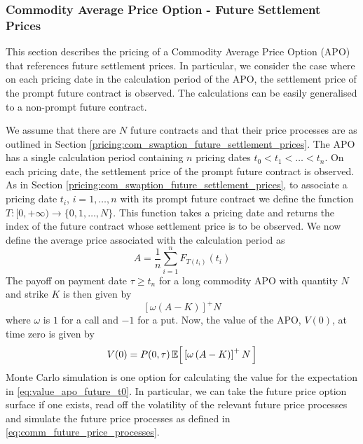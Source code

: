 \subsubsection{Commodity Average Price Option - Future Settlement Prices}
\label{pricing:com_apo_future_settlement_prices}

This section describes the pricing of a Commodity Average Price Option (APO) that references future settlement prices. In particular, we consider the case where on each pricing date in the calculation period of the APO, the settlement price of the prompt future contract is observed. The calculations can be easily generalised to a non-prompt future contract.

We assume that there are $N$ future contracts and that their price processes are as outlined in Section \ref{pricing:com_swaption_future_settlement_prices}. The APO has a single calculation period containing $n$ pricing dates $t_0 < t_1 < \ldots < t_n$. On each pricing date, the settlement price of the prompt future contract is observed. As in Section \ref{pricing:com_swaption_future_settlement_prices}, to associate a pricing date $t_i$, $i = 1, \ldots, n$ with its prompt future contract we define the function $T:[0, +\infty) \to \{ 0, 1, \ldots, N \}$. This function takes a pricing date and returns the index of the future contract whose settlement price is to be observed. We now define the average price associated with the calculation period as
\begin{equation}
\label{eq:comm_apo_future_A}
A = \frac{1}{n} \sum_{i=1}^{n} F_{T(t_{i})}(t_{i})
\end{equation}
The payoff on payment date $\tau \geq t_n$ for a long commodity APO with quantity $N$ and strike $K$ is then given by
\begin{equation}
\left[ \omega \left( A - K \right) \right]^{+} N
\end{equation}
where $\omega$ is $1$ for a call and $-1$ for a put. Now, the value of the APO, $V(0)$, at time zero is given by
\begin{equation}
\label{eq:value_apo_future_t0}
V(0) = P(0, \tau) \Ex{ \left[ \omega \left( A - K \right) \right]^{+} N }
\end{equation}
Monte Carlo simulation is one option for calculating the value for the expectation in \eqref{eq:value_apo_future_t0}. In particular, we can take the future price option surface if one exists, read off the volatility of the relevant future price processes and simulate the future price processes as defined in \eqref{eq:comm_future_price_processes}.

